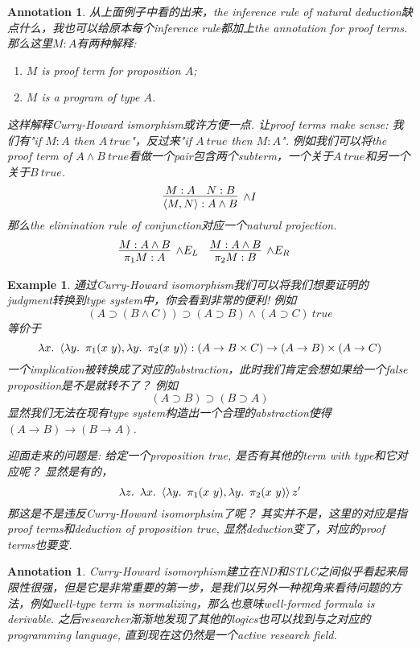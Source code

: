 \documentclass{article}
\theoremstyle{plain}
\newtheorem{example}[theorem]{Example}
\newtheorem{annotation}[theorem]{Annotation}
\theoremstyle{nonumberplain}
\newcommand{\lam}[2]{\ensuremath{\lambda #1\ldotp~ #2}} %
\begin{document}
\begin{annotation}
\rm 从上面例子中看的出来，the inference rule of natural deduction缺点什么，我也可以给原本每个inference rule都加上the annotation for proof terms. \cite{FP-pap}那么这里$M:A$有两种解释:
\begin{enumerate}
	\item $M$ is proof term for proposition $A$;
	\item $M$ is a program of type $A$. 
\end{enumerate}
这样解释Curry-Howard ismorphism或许方便一点. 让proof terms make sense: 我们有"if $M:A$ then $A~true$"，反过来"if $A~true$ then $M:A$". 例如我们可以将the proof term of $A \wedge B~true$看做一个pair包含两个subterm，一个关于$A~true$和另一个关于$B~true$.
$$
\infer[\wedge I]{\left<M,N\right>: A \wedge B}{M:A & N:B}
$$
那么the elimination rule of conjunction对应一个natural projection.
$$
\begin{aligned}
\infer[\wedge E_L]{\pi_1 M:A}{M:A \wedge B} &&& \infer[\wedge E_R]{\pi_2 M:B}{M:A \wedge B} 
\end{aligned}
$$ 
\end{annotation}


\begin{example}
\rm 通过Curry-Howard isomorphism我们可以将我们想要证明的judgment转换到type system中，你会看到非常的便利! 例如
$$
(A \supset (B \wedge C)) \supset (A \supset B) \wedge (A \supset C)~true
$$
等价于
$$
\lam{x}{\left<\lam{y}{\pi_1(x~y)},\lam{y}{\pi_2(x~y)} \right>}: (A \to B \times C) \to (A \to B) \times (A \to C)
$$
一个implication被转换成了对应的abstraction，此时我们肯定会想如果给一个false proposition是不是就转不了？ 例如
$$
(A \supset B) \supset (B \supset A)
$$
显然我们无法在现有type system构造出一个合理的abstraction使得$(A \to B) \to (B \to A)$.

迎面走来的问题是: 给定一个proposition true, 是否有其他的term with type和它对应呢？ 显然是有的，
$$
\lam{z}{\lam{x}{\left<\lam{y}{\pi_1(x~y)},\lam{y}{\pi_2(x~y)} \right>}}z'
$$
那这是不是违反Curry-Howard isomorphsim了呢？ 其实并不是，这里的对应是指proof terms和deduction of proposition true,  显然deduction变了，对应的proof terms也要变. 
\end{example}

\begin{annotation}
\rm Curry-Howard isomorphism建立在ND和STLC之间似乎看起来局限性很强，但是它是非常重要的第一步，是我们以另外一种视角来看待问题的方法，例如well-type term is normalizing，那么也意味well-formed formula is derivable. 之后researcher渐渐地发现了其他的logics也可以找到与之对应的programming language, 直到现在这仍然是一个active research field.
\end{annotation}
\end{document}
